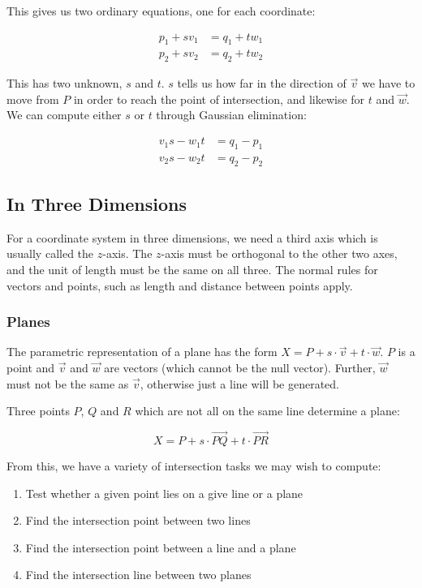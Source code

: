 \documentclass{article}
\begin{document}
	This gives us two ordinary equations, one for each coordinate:
	
	\begin{align*}
	p_{1} + sv_{1} &= q_{1} + tw_{1} \\
	p_{2} + sv_{2} &= q_{2} + tw_{2}
	\end{align*}
	
	This has two unknown, $s$ and $t$. $s$ tells us how far in the direction of $\overrightarrow{v}$ we have to move from $P$ in order to reach the point of intersection, and likewise for $t$ and $\overrightarrow{w}$. We can compute either $s$ or $t$ through Gaussian elimination:
	
	\begin{align*}
	v_{1}s - w_{1}t &= q_{1} - p_{1} \\
	v_{2}s - w_{2}t &= q_{2} - p_{2}
	\end{align*}
	
	\subsection{In Three Dimensions}
	For a coordinate system in three dimensions, we need a third axis which is usually called the $z$-axis. The $z$-axis must be orthogonal to the other two axes, and the unit of length must be the same on all three. The normal rules for vectors and points, such as length and distance between points apply.
	
	\subsubsection{Planes}
	The parametric representation of a plane has the form $X = P + s \cdot \overrightarrow{v} + t \cdot \overrightarrow{w}$. $P$ is a point and $\overrightarrow{v}$ and $\overrightarrow{w}$ are vectors (which cannot be the null vector). Further, $\overrightarrow{w}$ must not be the same as $\overrightarrow{v}$, otherwise just a line will be generated.
	
	\par Three points $P$, $Q$ and $R$ which are not all on the same line determine a plane:
	
	\[ X = P + s \cdot \overrightarrow{PQ} + t \cdot \overrightarrow{PR} \]
	
	From this, we have a variety of intersection tasks we may wish to compute:
	
	\begin{enumerate}
		\item Test whether a given point lies on a give line or a plane
		\item Find the intersection point between two lines
		\item Find the intersection point between a line and a plane
		\item Find the intersection line between two planes
	\end{enumerate}
	
\end{document}
